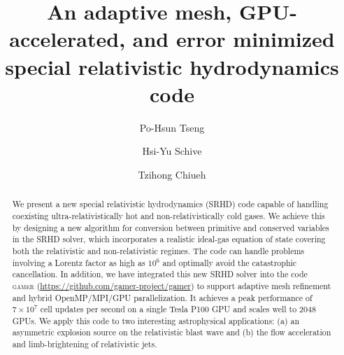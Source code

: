 \documentclass[twocolumn]{aastex63}
\begin{document}
\title{An adaptive mesh, GPU-accelerated, and error minimized special relativistic hydrodynamics code}


\author[0000-0002-1868-0660]{Po-Hsun Tseng}

\author[0000-0002-1249-279X]{Hsi-Yu Schive}

\author[0000-0003-2654-8763]{Tzihong Chiueh}





\begin{abstract}
We present a new special relativistic hydrodynamics (SRHD) code capable of handling coexisting
ultra-relativistically hot and non-relativistically cold gases.
We achieve this by designing a new algorithm for conversion between primitive and
conserved variables in the SRHD solver, which incorporates a realistic ideal-gas
equation of state covering both the relativistic and non-relativistic regimes.
The code can handle problems involving a Lorentz factor as high as $10^6$ and optimally
avoid the catastrophic cancellation. In addition, we have integrated this new SRHD solver
into the code \textsc{gamer} (\url{https://github.com/gamer-project/gamer}) to support
adaptive mesh refinement and hybrid OpenMP/MPI/GPU parallelization.
It achieves a peak performance of $7\times 10^{7}$ cell updates per second on a
single Tesla P100 GPU and scales well to 2048 GPUs. We apply this code
to two interesting astrophysical applications: (a) an asymmetric explosion source
on the relativistic blast wave and (b) the flow acceleration and limb-brightening of
relativistic jets.
\end{abstract}
\end{document}
